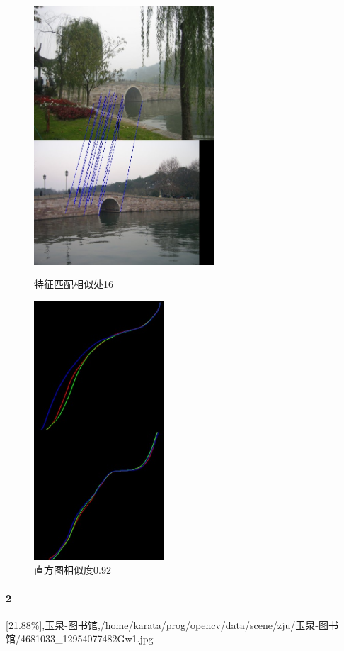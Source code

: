 \begin{figure}[htb]
\begin{minipage}[t]{0.5\linewidth}
\centering
\includegraphics[height=3.8in]{西泠.jpg.d/im1sift.jpg}
\caption{特征匹配相似处16}
\label{fig:side:a}
\end{minipage}%
\begin{minipage}[t]{0.5\linewidth}
\centering
\includegraphics[height=3.8in]{西泠.jpg.d/im1hist2.jpg}
\caption{直方图相似度0.92}
\label{fig:side:a}
\end{minipage}%
\end{figure}

\clearpage
\paragraph{2}
[21.88\%],玉泉-图书馆,/home/karata/prog/opencv/data/scene/zju/玉泉-图书馆/4681033\_12954077482Gw1.jpg

